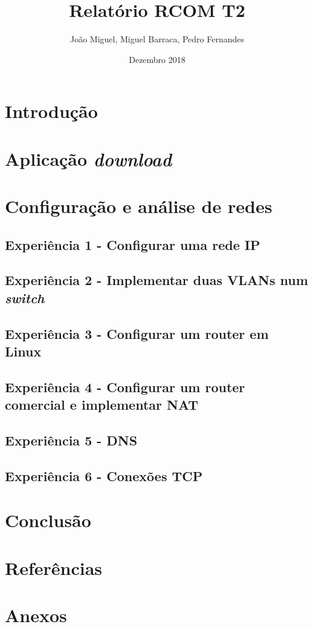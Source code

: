 \documentclass{article}
\title{Relatório RCOM T2}
\author{João Miguel, Miguel Barraca, Pedro Fernandes}
\date{Dezembro 2018}
\begin{document}
\maketitle

\tableofcontents

\section{Introdução}
\section{Aplicação \textit{download}}
\section{Configuração e análise de redes}
\subsection{Experiência 1 - Configurar uma rede IP}
\subsection{Experiência 2 - Implementar duas VLANs num \textit{switch}}
\subsection{Experiência 3 - Configurar um router em Linux}
\subsection{Experiência 4 - Configurar um router comercial e implementar NAT}
\subsection{Experiência 5 - DNS}
\subsection{Experiência 6 - Conexões TCP}
\section{Conclusão}
\section{Referências}
\section{Anexos}
\end{document}
